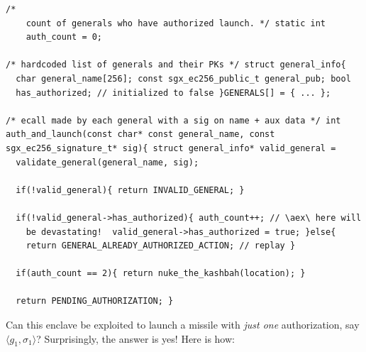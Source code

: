 \documentclass[letterpaper]{article}
\newcommand{\aex}{\textsf{AEX}}
\begin{document}
  \begin{center}
  \begin{lstlisting}[captionpos=b,
                     caption={An enclave suseptible to state
                       malleability}, label=code:malleability] /*
    count of generals who have authorized launch. */ static int
    auth_count = 0;

/* hardcoded list of generals and their PKs */ struct general_info{
  char general_name[256]; const sgx_ec256_public_t general_pub; bool
  has_authorized; // initialized to false }GENERALS[] = { ... };

/* ecall made by each general with a sig on name + aux data */ int
auth_and_launch(const char* const general_name, const
sgx_ec256_signature_t* sig){ struct general_info* valid_general =
  validate_general(general_name, sig);

  if(!valid_general){ return INVALID_GENERAL; }

  if(!valid_general->has_authorized){ auth_count++; // \aex\ here will
    be devastating!  valid_general->has_authorized = true; }else{
    return GENERAL_ALREADY_AUTHORIZED_ACTION; // replay }

  if(auth_count == 2){ return nuke_the_kashbah(location); }

  return PENDING_AUTHORIZATION; }
\end{lstlisting}
\end{center}

  Can this enclave be exploited to launch a missile with \textit{just
    one} authorization, say $\langle g_1, \sigma_1 \rangle$?
  Surprisingly, the answer is yes! Here is how:
\end{document}
